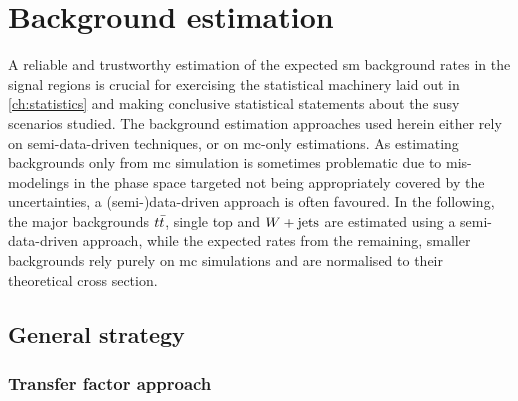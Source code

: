 

\chapter{Background estimation}\label{ch:background_estimation}

\ifpdf
    \graphicspath{{chapter-background/Figs/Raster/}{chapter-background/Figs/PDF/}{chapter-background/Figs/}}
\else
    \graphicspath{{chapter-background/Figs/Vector/}{chapter-background/Figs/}}
\fi


A reliable and trustworthy estimation of the expected \gls{sm} background rates in the signal regions is crucial for exercising the statistical machinery laid out in \cref{ch:statistics} and making conclusive statistical statements about the \gls{susy} scenarios studied. The background estimation approaches used herein either rely on semi-data-driven techniques, or on \gls{mc}-only estimations. As estimating backgrounds only from \gls{mc} simulation is sometimes problematic due to \eg mis-modelings in the phase space targeted not being appropriately covered by the uncertainties, a (semi-)data-driven approach is often favoured. In the following, the major backgrounds $t\bar{t}$, single top and $W+\mathrm{jets}$ are estimated using a semi-data-driven approach, while the expected rates from the remaining, smaller backgrounds rely purely on \gls{mc} simulations and are normalised to their theoretical cross section.

\section{General strategy}

\subsection{Transfer factor approach}

